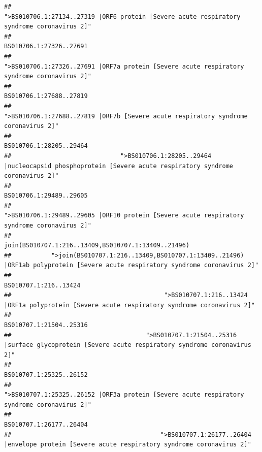 \documentclass[
]{article}
\begin{document}
\begin{verbatim}
##                                             ">BS010706.1:27134..27319 |ORF6 protein [Severe acute respiratory syndrome coronavirus 2]" 
##                                                                                                                BS010706.1:27326..27691 
##                                            ">BS010706.1:27326..27691 |ORF7a protein [Severe acute respiratory syndrome coronavirus 2]" 
##                                                                                                                BS010706.1:27688..27819 
##                                                    ">BS010706.1:27688..27819 |ORF7b [Severe acute respiratory syndrome coronavirus 2]" 
##                                                                                                                BS010706.1:28205..29464 
##                              ">BS010706.1:28205..29464 |nucleocapsid phosphoprotein [Severe acute respiratory syndrome coronavirus 2]" 
##                                                                                                                BS010706.1:29489..29605 
##                                            ">BS010706.1:29489..29605 |ORF10 protein [Severe acute respiratory syndrome coronavirus 2]" 
##                                                                                    join(BS010707.1:216..13409,BS010707.1:13409..21496) 
##           ">join(BS010707.1:216..13409,BS010707.1:13409..21496) |ORF1ab polyprotein [Severe acute respiratory syndrome coronavirus 2]" 
##                                                                                                                  BS010707.1:216..13424 
##                                          ">BS010707.1:216..13424 |ORF1a polyprotein [Severe acute respiratory syndrome coronavirus 2]" 
##                                                                                                                BS010707.1:21504..25316 
##                                     ">BS010707.1:21504..25316 |surface glycoprotein [Severe acute respiratory syndrome coronavirus 2]" 
##                                                                                                                BS010707.1:25325..26152 
##                                            ">BS010707.1:25325..26152 |ORF3a protein [Severe acute respiratory syndrome coronavirus 2]" 
##                                                                                                                BS010707.1:26177..26404 
##                                         ">BS010707.1:26177..26404 |envelope protein [Severe acute respiratory syndrome coronavirus 2]" 

\end{verbatim}
\end{document}
